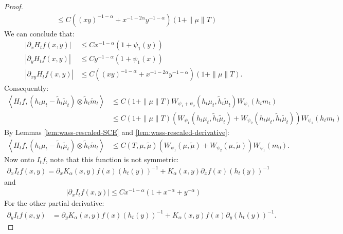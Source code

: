 \documentclass[11pt,a4paper]{article}
\newcommand{\brac}[1]{\left\langle#1\right\rangle}
\begin{document}
\begin{proof}
\begin{align*}
        &\leq C \left((xy)^{-1-\alpha} + x^{-1-2\alpha}y^{-1-\alpha} \right)\left(1 + \|\mu\|T\right)
    \end{align*}
    We can conclude that:
    \begin{align*}
        \left|\partial_x H_tf(x,y)\right| &\leq C x^{-1-\alpha} (1 + \psi_1(y)) \\
        \left|\partial_y H_tf(x,y)\right| &\leq C y^{-1-\alpha} (1 + \psi_1(x)) \\
        \left|\partial_{xy}H_tf(x,y) \right| &\leq  C \left((xy)^{-1-\alpha} + x^{-1-2\alpha}y^{-1-\alpha} \right)\left(1 + \|\mu\|T\right).
    \end{align*}
    Consequently:
    \begin{align*}
        \brac{H_tf,\left(h_t\mu_t - \tilde{h}_t\tilde{\mu}_t\right)\otimes \tilde{h}_t\tilde{m}_t} 
        &\leq C\left(1 + \|\mu\|T\right)W_{\psi_1 + \psi_2}\left( h_t\mu_t , \tilde{h}_t\tilde{\mu}_t\right)W_{\psi_1}\left(h_t m_t \right) \\
        &\leq C\left(1 + \|\mu\|T\right)\left(W_{\psi_1}\left( h_t\mu_t , \tilde{h}_t\tilde{\mu}_t\right) + W_{\psi_2}\left( h_t\mu_t , \tilde{h}_t\tilde{\mu}_t\right)\right)W_{\psi_1}\left(h_t m_t \right)
    \end{align*}
    By Lemmas \ref{lem:wass-rescaled-SCE} and \ref{lem:wass-rescaled-derivative}:
    \begin{align*}
        \brac{H_tf,\left(h_t\mu_t - \tilde{h}_t\tilde{\mu}_t\right)\otimes \tilde{h}_t\tilde{m}_t}  
        &\leq C(T,\mu,\tilde{\mu})\left(W_{\psi_1}\left( \mu , \tilde{\mu}\right) + W_{\psi_2}\left( \mu , \tilde{\mu}\right)\right)W_{\psi_1}\left(m_0\right).
    \end{align*}
    Now onto $I_tf$, note that this function is not symmetric:
    \begin{align*}
        \partial_x I_tf(x,y) = \partial_x K_\alpha(x,y) f(x) \left(h_t(y)\right)^{-1} + K_\alpha(x,y) \partial_x f(x)  \left(h_t(y)\right)^{-1}
    \end{align*}
    and
    \begin{align*}
        \left| \partial_x I_tf(x,y)\right|  \leq C x^{-1-\alpha} (1 + x^{-\alpha} + y^{-\alpha})
    \end{align*}
    For the other partial derivative:
    \begin{align*}
        \partial_y I_tf(x,y) 
        &= \partial_y K_\alpha(x,y) f(x) \left(h_t(y)\right)^{-1} + K_\alpha(x,y)  f(x) \partial_y \left(h_t(y)\right)^{-1}.
    \end{align*}

\end{proof}
\end{document}
